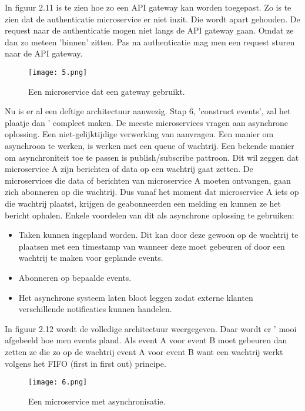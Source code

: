 In figuur 2.11 is te zien hoe zo een API gateway kan worden toegepast. Zo is te zien dat de authenticatie microservice er niet inzit. Die wordt apart gehouden. De request naar de authenticatie mogen niet langs de API gateway gaan. Omdat ze dan zo meteen 'binnen' zitten. Pas na authenticatie mag men een request sturen naar de API gateway.
\begin{figure}[h]
	\texttt{[image: 5.png]}
	\caption{Een microservice dat een gateway gebruikt. \textcite{Benetis2016}}
	\centering
\end{figure}

Nu is er al een deftige architectuur aanwezig. Stap 6, 'construct events', zal het plaatje dan ' compleet maken. De meeste microservices vragen aan asynchrone oplossing. Een niet-gelijktijdige verwerking van aanvragen. Een manier om asynchroon te  werken, is  werken met een queue of wachtrij. Een bekende manier om asynchroniteit toe te passen is publish/subscribe pattroon. Dit wil zeggen dat microservice A zijn berichten of data op een wachtrij gaat zetten. De microservices die data of berichten van microservice A moeten ontvangen, gaan zich abonneren op die wachtrij. Dus vanaf het moment dat microservice A iets op die wachtrij plaatst, krijgen de geabonneerden een melding en kunnen ze het bericht ophalen. Enkele voordelen van dit als asynchrone oplossing te gebruiken:
\begin{itemize}
	\item Taken kunnen ingepland worden. Dit kan door deze gewoon op de wachtrij te plaatsen met een timestamp van wanneer deze moet gebeuren of door een wachtrij te maken voor geplande events.
	\item Abonneren op bepaalde events.
	\item Het asynchrone systeem laten bloot leggen zodat externe klanten verschillende notificaties kunnen handelen.
\end{itemize}
In figuur 2.12 wordt de volledige architectuur  weergegeven. Daar wordt er ' mooi afgebeeld hoe men events pland. Als event A voor event B moet gebeuren dan zetten ze die zo op de wachtrij event A voor event B want een wachtrij  werkt volgens het FIFO (first in first out) principe.
\begin{figure}[h]
	\texttt{[image: 6.png]}
	\caption{Een microservice met asynchronisatie. \textcite{Benetis2016}}
	\centering
\end{figure}

